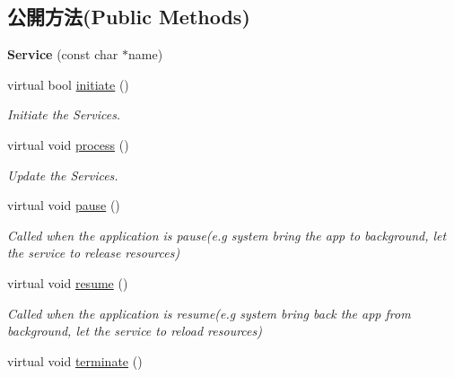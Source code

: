 \subsection*{公開方法(Public Methods)}
\begin{DoxyCompactItemize}
\item 
{\bfseries Service} (const char $\ast$name)\hypertarget{class_magnum_1_1_service_a6ea01563c51ddee3d08351ad4f68e1ad}{}\label{class_magnum_1_1_service_a6ea01563c51ddee3d08351ad4f68e1ad}

\item 
virtual bool \hyperlink{class_magnum_1_1_service_a33d6803c347e20f044b0dc63f62ae6fa}{initiate} ()
\begin{DoxyCompactList}\small\item\em Initiate the Services. \end{DoxyCompactList}\item 
virtual void \hyperlink{class_magnum_1_1_service_a0ff3d8b17dee06f7b4d9ea8b42c407b8}{process} ()\hypertarget{class_magnum_1_1_service_a0ff3d8b17dee06f7b4d9ea8b42c407b8}{}\label{class_magnum_1_1_service_a0ff3d8b17dee06f7b4d9ea8b42c407b8}

\begin{DoxyCompactList}\small\item\em Update the Services. \end{DoxyCompactList}\item 
virtual void \hyperlink{class_magnum_1_1_service_aa32bc1741c7871c60d8f0b696da93f57}{pause} ()\hypertarget{class_magnum_1_1_service_aa32bc1741c7871c60d8f0b696da93f57}{}\label{class_magnum_1_1_service_aa32bc1741c7871c60d8f0b696da93f57}

\begin{DoxyCompactList}\small\item\em Called when the application is pause(e.\+g system bring the app to background, let the service to release resources) \end{DoxyCompactList}\item 
virtual void \hyperlink{class_magnum_1_1_service_ad4127e32177955d33f4558e691b4c7b4}{resume} ()\hypertarget{class_magnum_1_1_service_ad4127e32177955d33f4558e691b4c7b4}{}\label{class_magnum_1_1_service_ad4127e32177955d33f4558e691b4c7b4}

\begin{DoxyCompactList}\small\item\em Called when the application is resume(e.\+g system bring back the app from background, let the service to reload resources) \end{DoxyCompactList}\item 
virtual void \hyperlink{class_magnum_1_1_service_a49190db22bbb551465eb2331bcbe34b8}{terminate} ()\hypertarget{class_magnum_1_1_service_a49190db22bbb551465eb2331bcbe34b8}{}\label{class_magnum_1_1_service_a49190db22bbb551465eb2331bcbe34b8}


\end{DoxyCompactItemize}
